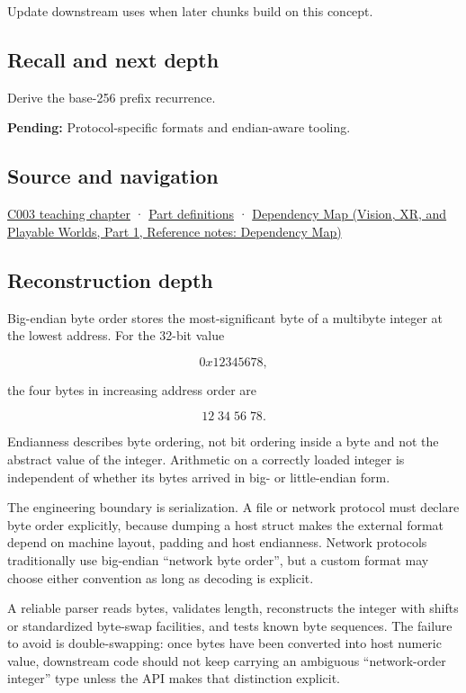 \hypertarget{appendix-92e040df969a-used-by}{}

Update downstream uses when later chunks build on this concept.

\subsection{Recall and next depth}\label{appendix-92e040df969a-recall-and-next-depth}

\hypertarget{appendix-92e040df969a-recall-and-next-depth}{}

Derive the base-256 prefix recurrence.

\textbf{Pending:} Protocol-specific formats and endian-aware tooling.

\subsection{Source and navigation}\label{appendix-92e040df969a-source-and-navigation}

\hypertarget{appendix-92e040df969a-source-and-navigation}{}

\hyperref[01-foundations-i-ch002-where-the-bytes-live]{C003 teaching chapter} · \hyperref[appendix-fd090d982a15-m003---parts-41-60]{Part definitions} · \href{../07-Vision-XR-and-Playable-Worlds-P01/main.pdf\#appendix-4ad47bdd269a}{Dependency Map (Vision, XR, and Playable Worlds, Part 1, Reference notes: Dependency Map)}

\subsection{Reconstruction depth}\label{appendix-92e040df969a-reconstruction-depth}

\hypertarget{appendix-92e040df969a-reconstruction-depth}{}

Big-endian byte order stores the most-significant byte of a multibyte integer at the lowest address. For the 32-bit value

\[
0x12345678,
\]

the four bytes in increasing address order are

\[
12\;34\;56\;78.
\]

Endianness describes byte ordering, not bit ordering inside a byte and not the abstract value of the integer. Arithmetic on a correctly loaded integer is independent of whether its bytes arrived in big- or little-endian form.

The engineering boundary is serialization. A file or network protocol must declare byte order explicitly, because dumping a host struct makes the external format depend on machine layout, padding and host endianness. Network protocols traditionally use big-endian ``network byte order'', but a custom format may choose either convention as long as decoding is explicit.

A reliable parser reads bytes, validates length, reconstructs the integer with shifts or standardized byte-swap facilities, and tests known byte sequences. The failure to avoid is double-swapping: once bytes have been converted into host numeric value, downstream code should not keep carrying an ambiguous ``network-order integer'' type unless the API makes that distinction explicit.
